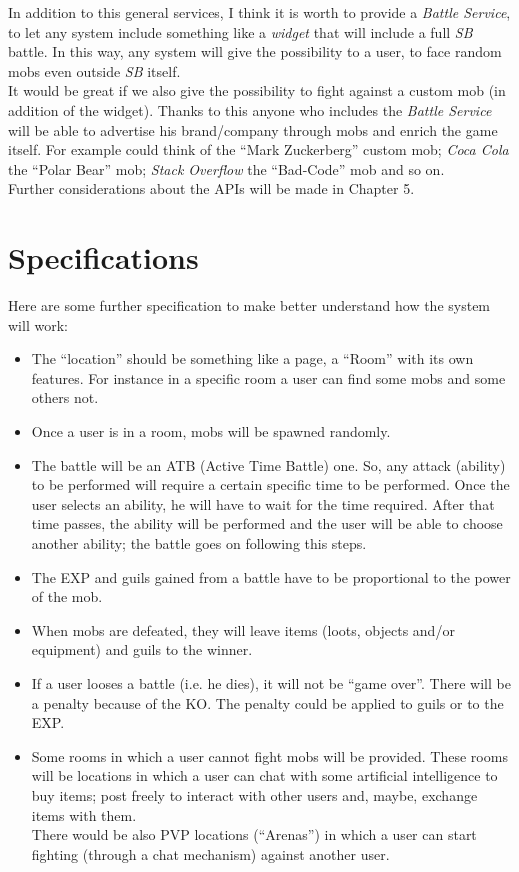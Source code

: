 		In addition to this general services, I think it is worth to provide a \textit{Battle Service}, to let any system 
		include something like a \textit{widget} that will include a full \textit{SB} battle. In this way, any system will give the possibility to a \SocialBattle{} user, to face random mobs even outside \textit{SB} itself.\\
		It would be great if we also give the possibility to fight against a custom mob (in addition of the widget). Thanks to this anyone who includes the \textit{Battle Service} will be able to advertise his brand/company through mobs and enrich the game itself. For example \Facebook{} could think of the ``Mark Zuckerberg'' custom mob; \textit{Coca Cola} the ``Polar Bear'' mob; \textit{Stack Overflow} the ``Bad-Code'' mob and so on.\\

		Further considerations about the APIs will be made in Chapter 5.
	\section{Specifications}
		Here are some further specification to make better understand how the system will work:
		\begin{itemize}
			\item The ``location'' should be something like a \Facebook{} page, a ``Room'' with its own features. For instance in a specific room a user can find some mobs and some others not.
			\item Once a user is in a room, mobs will be spawned randomly.
			\item The battle will be an ATB (Active Time Battle) one. So, any attack (ability) to be performed will require a certain specific time to be performed. Once the user selects an ability, he will have to wait for the time required. After that time passes, the ability will be performed and the user will be able to choose another ability; the battle goes on following this steps.
			\item The EXP and guils gained from a battle have to be proportional to the power of the mob.
			\item When mobs are defeated, they will leave items (loots, objects and/or equipment) and guils to the winner.
			\item If a user looses a battle (i.e. he dies), it will not be ``game over''. There will be a penalty because of the KO. The penalty could be applied to guils or to the EXP.
			\item Some rooms in which a user cannot fight mobs will be provided. These rooms will be locations in which a user can chat with some artificial intelligence to buy items; post freely to interact with other users and, maybe, exchange items with them.\\
			There would be also PVP locations (``Arenas'') in which a user can start fighting (through a chat mechanism) against another user.
		\end{itemize}


